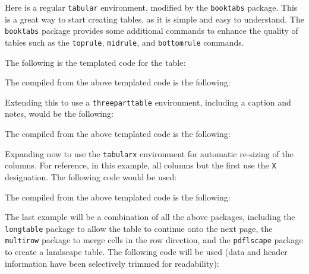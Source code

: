 Here is a regular \texttt{tabular} environment, modified by the \texttt{booktabs} package. This is a great way to start creating tables, as it is simple and easy to understand. The \texttt{booktabs} package provides some additional commands to enhance the quality of tables such as the \texttt{toprule}, \texttt{midrule}, and \texttt{bottomrule} commands.

The following is the templated code for the table:



The compiled from the above templated code is the following:



Extending this to use a \texttt{threeparttable} environment, including a caption and notes, would be the following:



The compiled from the above templated code is the following:



Expanding now to use the \texttt{tabularx} environment for automatic re-sizing of the columns. For reference, in this example, all columns but the first use the \texttt{X} designation. The following code would be used:



The compiled from the above templated code is the following:



The last example will be a combination of all the above packages, including the \texttt{longtable} package to allow the table to continue onto the next page, the \texttt{multirow} package to merge cells in the row direction, and the \texttt{pdflscape} package to create a landscape table. The following code will be used (data and header information have been selectively trimmed for readability):



